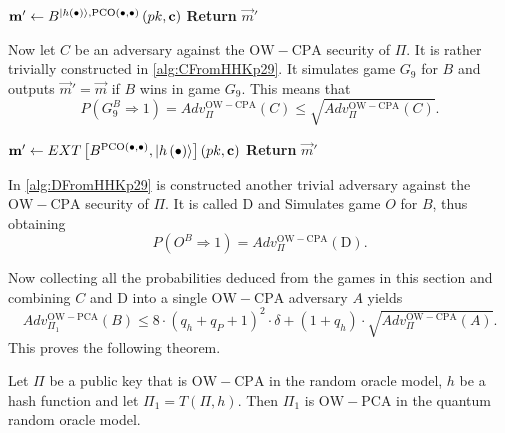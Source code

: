 \begin{center}
	\begin{minipage}[ht!]{0.5\textwidth}
		\begin{algorithm}[H]
			\centering
			\caption{$C\left(pk, \vec{c}\right)$}
			\label{alg:CFromHHKp29}
			\begin{algorithmic}
				\State $\boldsymbol{\mathrm{m}}' \leftarrow B^{\lvert h\left(\bullet\right)\rangle, \mathrm{PCO}\left(\bullet,\bullet\right)}\left(pk, \boldsymbol{\mathrm{c}}\right)$
				\State \textbf{Return} $\vec{m}'$
			\end{algorithmic}
		\end{algorithm}
	\end{minipage}
\end{center}

Now let $C$ be an adversary against the $\mathrm{OW-CPA}$ security of $\Pi$. It is rather trivially constructed in \cref{alg:CFromHHKp29}. It simulates game $G_9$ for $B$ and outputs $\vec{m}' = \vec{m}$ if $B$ wins in game $G_9$. This means that
\[
	P\left( G_9^B \Rightarrow 1 \right) = Adv_{\Pi}^{\mathrm{OW-CPA}}\left(C\right) \leq \sqrt{Adv_{\Pi}^{\mathrm{OW-CPA}}\left(C\right)}.
\]

\begin{center}
	\begin{minipage}[ht!]{0.5\textwidth}
		\begin{algorithm}[H]
			\center
			\caption{$\mathrm{D}\left(pk, \vec{c}\right)$}
			\label{alg:DFromHHKp29}
			\begin{algorithmic}
				\State $\boldsymbol{\mathrm{m}}' \leftarrow EXT\left[ B^{\mathrm{PCO}\left(\bullet,\bullet\right)}, \lvert h\left(\bullet\right)\rangle \right] \left(pk, \boldsymbol{\mathrm{c}}\right)$
				\State \textbf{Return} $\vec{m}'$
			\end{algorithmic}
		\end{algorithm}
	\end{minipage}
\end{center}

In \cref{alg:DFromHHKp29} is constructed another trivial adversary against the $\mathrm{OW-CPA}$ security of $\Pi$. It is called $\mathrm{D}$ and Simulates game $O$ for $B$, thus obtaining
\[
	P\left( O^B \Rightarrow 1 \right) = Adv_{\Pi}^{\mathrm{OW-CPA}}\left(\mathrm{D}\right).
\]

Now collecting all the probabilities deduced from the games in this section and combining $C$ and $\mathrm{D}$ into a single $\mathrm{OW-CPA}$ adversary $A$ yields
\begin{equation}
\label{eq:boundForTInTheQROM}
	Adv_{\Pi_1}^{\mathrm{OW-PCA}}\left(B\right) \leq 8 \cdot \left( q_h + q_P + 1 \right) ^2 \cdot \delta + \left( 1 +q_h \right) \cdot \sqrt{Adv_{\Pi}^{\mathrm{OW-CPA}}\left(A\right)}.
\end{equation}
This proves the following theorem.
\begin{thm}
\label{thm:TInTheQROM}
	Let $\Pi$ be a public key that is $\mathrm{OW-CPA}$ in the random oracle model, $h$ be a hash function and let $\Pi_1 = T\left( \Pi , h \right) $. Then $\Pi_1$ is $\mathrm{OW-PCA}$ in the quantum random oracle model.
\end{thm}



